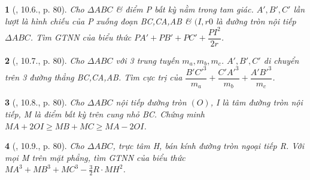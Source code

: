 \documentclass{article}
\newtheorem{baitoan}{}
\begin{document}
\begin{baitoan}[\cite{Hai_Hung_Thu_Tung2022_tap_1}, 10.6., p. 80]
	Cho $\Delta ABC$ \& điểm P bất kỳ nằm trong tam giác. $A',B',C'$ lần lượt là hình chiếu của P xuống đoạn BC,CA,AB \& $(I,r0$ là đường tròn nội tiếp $\Delta ABC$. Tìm {\rm GTNN} của biểu thức $PA' + PB' + PC' + \dfrac{PI^2}{2r}$.
\end{baitoan}

\begin{baitoan}[\cite{Hai_Hung_Thu_Tung2022_tap_1}, 10.7., p. 80]
	Cho $\Delta ABC$ với 3 trung tuyến $m_a,m_b,m_c$. $A',B',C'$ di chuyển trên 3 đường thẳng BC,CA,AB. Tìm cực trị của $\dfrac{B'C'^3}{m_a} + \dfrac{C'A'^3}{m_b} + \dfrac{A'B'^3}{m_c}$.
\end{baitoan}

\begin{baitoan}[\cite{Hai_Hung_Thu_Tung2022_tap_1}, 10.8., p. 80]
	Cho $\Delta ABC$ nội tiếp đường tròn $(O)$, I là tâm đường tròn nội tiếp, M là điểm bất kỳ trên cung nhỏ BC. Chứng minh $MA + 2OI\ge MB + MC\ge MA - 2OI$.
\end{baitoan}

\begin{baitoan}[\cite{Hai_Hung_Thu_Tung2022_tap_1}, 10.9., p. 80]
	Cho $\Delta ABC$, trực tâm H, bán kính đường tròn ngoại tiếp R. Với mọi M trên mặt phẳng, tìm {\rm GTNN} của biểu thức $MA^3 + MB^3 + MC^3 - \frac{3}{2}R\cdot MH^2$.
\end{baitoan}


\printbibliography[heading=bibintoc]
	
\end{document}

